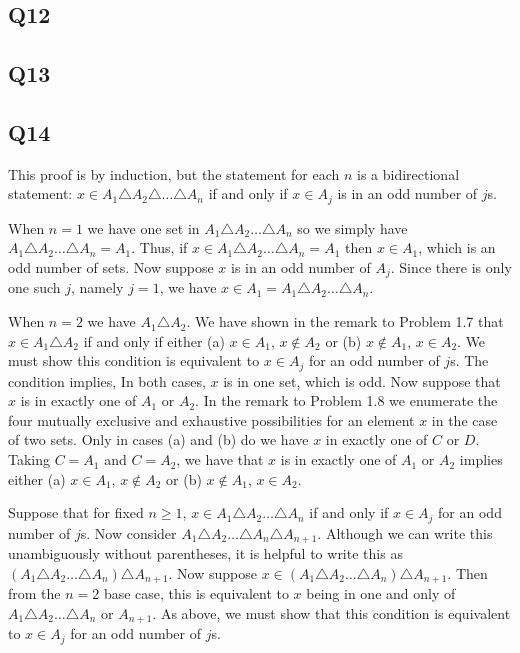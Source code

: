 \documentclass[12pt]{article}
\numberwithin{theorem}{section}
\numberwithin{equation}{section}
\numberwithin{remark}{section}
\numberwithin{definition}{section}
\numberwithin{theorem}{section}
\numberwithin{lemma}{section}
\numberwithin{example}{section}
\begin{document}
\subsection{Q12}

\subsection{Q13}

\subsection{Q14}

This proof is by induction, but the statement for each $n$ is a bidirectional statement: $x\in A_1 \triangle A_2 \triangle\ldots\triangle A_n$ if and only if $x\in A_j$ is in an odd number of $j$s. 

When $n=1$ we have one set in $A_1\triangle A_2\ldots \triangle A_n$ so we simply have $A_1\triangle A_2\ldots \triangle A_n=A_1$. Thus, if $x\in A_1\triangle A_2\ldots \triangle A_n=A_1$ then $x\in A_1$, which is an odd number of sets. Now suppose $x$ is in an odd number of $A_j$. Since there is only one such $j$, namely $j=1$, we have $x\in A_1=A_1\triangle A_2\ldots \triangle A_n$. 

When $n=2$ we have $A_1\triangle A_2$. We have shown in the remark to Problem 1.7 that $x\in A_1\triangle A_2$ if and only if either (a) $x\in A_1$, $x\notin A_2$ or (b) $x\notin A_1$, $x\in A_2$. We must show this condition is equivalent to $x\in A_j$ for an odd number of $j$s. The condition implies, In both cases, $x$ is in one set, which is odd. Now suppose that $x$ is in exactly one of $A_1$ or $A_2$. In the remark to Problem 1.8 we enumerate the four mutually exclusive and exhaustive possibilities for an element $x$ in the case of two sets. Only in cases (a) and (b) do we have $x$ in exactly one of $C$ or $D$. Taking $C=A_1$ and $C=A_2$, we have that $x$ is in exactly one of $A_1$ or $A_2$ implies either (a) $x\in A_1$, $x\notin A_2$ or (b) $x\notin A_1$, $x\in A_2$. 

Suppose that for fixed $n\ge 1$, $x\in A_1\triangle A_2\ldots \triangle A_n$ if and only if $x\in A_j$ for an odd number of $j$s. Now consider $A_1\triangle A_2\ldots \triangle A_n\triangle A_{n+1}$. Although we can write this unambiguously without parentheses, it is helpful to write this as $(A_1\triangle A_2\ldots \triangle A_n) \triangle A_{n+1}$. Now suppose $x\in(A_1\triangle A_2\ldots \triangle A_n) \triangle A_{n+1}$. Then from the $n=2$ base case, this is equivalent to $x$ being in one and only of $A_1\triangle A_2\ldots \triangle A_n$ or $A_{n+1}$. As above, we must show that this condition is equivalent to $x\in A_j$ for an odd number of $j$s.
\end{document}
